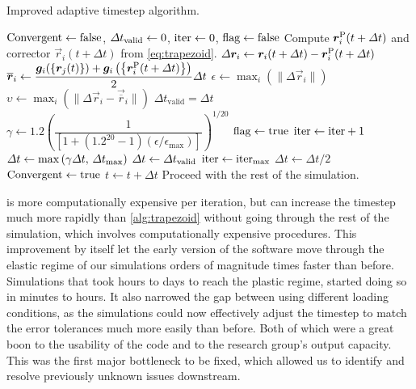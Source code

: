 \begin{algorithm}
    \caption{Improved adaptive timestep algorithm.}
    \label{alg:trapezoid_improved}
    \begin{algorithmic}
        \State $\textrm{Convergent} \gets \textrm{false}$, $\Delta t_{\textrm{valid}} \gets 0$, $\textrm{iter} \gets 0$, $\textrm{flag} \gets \textrm{false}$
        \State Compute $\vec{r}_i^{\rvar{P}}(t + \Delta t)$ and corrector $\vec{r}_i(t + \Delta t)$ from \cref{eq:trapezoid}.
        \State $\Delta \vec{r}_i \gets \vec{r}_i(t + \Delta t) - \vec{r}_i^{\rvar{P}}(t + \Delta t)$
        \State $\vec{\overline{r}}_i \gets \dfrac{\vec{g}_i(\left\{\vec{r}_j(t)\right\}) + \vec{g}_i\left(\left\{\vec{r}_i^{\rvar{P}}(t + \Delta t)\right\}\right)}{2}\Delta t$
        \State $\epsilon \gets \max_i\left(\lVert \Delta \vec{r}_i \rVert \right)$
        \State $\upsilon \gets \max_i\left(\lVert \Delta \vec{r}_i - \vec{\overline{r}}_i \rVert\right)$
        \State $\Delta t_{\textrm{valid}} = \Delta t$
        \State $\gamma \gets 1.2\left(\dfrac{1}{\left[1 + (1.2^{20} - 1) (\epsilon / \epsilon_{\textrm{max}})\right]}\right)^{1/20}$
        \State $\textrm{flag} \gets \textrm{true}$
        \State $\textrm{iter} \gets \textrm{iter} + 1$
        \State $\Delta t \gets \max\left(\gamma \Delta t,\, \Delta t_{\textrm{max}}\right)$
        \Else
        \State $\Delta t \gets \Delta t_{\textrm{valid}}$
        \State $\textrm{iter} \gets \textrm{iter}_{\textrm{max}}$
        \Else
        \State $\Delta t \gets \Delta t / 2$
        \EndIf
        \EndIf
        \State $\textrm{Convergent} \gets \textrm{true}$
        \EndIf
        \EndWhile
        \State $t \gets t + \Delta t$
        \State Proceed with the rest of the simulation.
    \end{algorithmic}
\end{algorithm}

 is more computationally expensive per iteration, but can increase the timestep much more rapidly than \cref{alg:trapezoid} without going through the rest of the simulation, which involves computationally expensive procedures. This improvement by itself let the early version of the software move through the elastic regime of our simulations orders of magnitude times faster than before. Simulations that took hours to days to reach the plastic regime, started doing so in minutes to hours. It also narrowed the gap between using different loading conditions, as the simulations could now effectively adjust the timestep to match the error tolerances much more easily than before. Both of which were a great boon to the usability of the code and to the research group's output capacity. This was the first major bottleneck to be fixed, which allowed us to identify and resolve previously unknown issues downstream.

